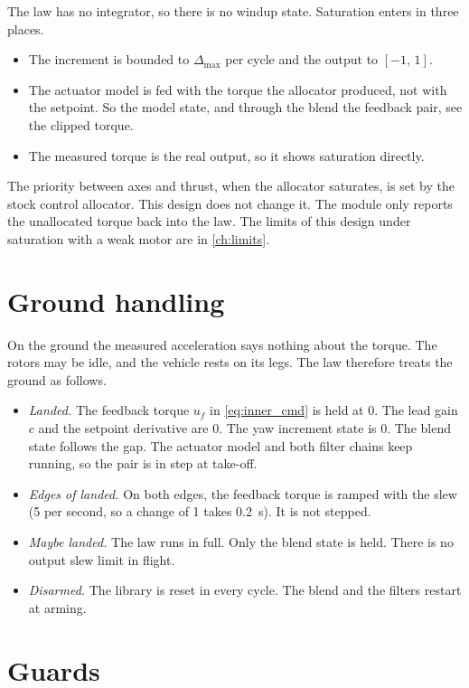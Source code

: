 The law has no integrator, so there is no windup state.
Saturation enters in three places.
\begin{itemize}
  \item The increment is bounded to $\Delta_{\max}$ per cycle and the output to $[-1,\,1]$.
  \item The actuator model is fed with the torque the allocator produced, not with the setpoint.
    So the model state, and through the blend the feedback pair, see the clipped torque.
  \item The measured torque is the real output, so it shows saturation directly.
\end{itemize}
The priority between axes and thrust, when the allocator saturates, is set by the stock control allocator.
This design does not change it.
The module only reports the unallocated torque back into the law.
The limits of this design under saturation with a weak motor are in \cref{ch:limits}.

\section{Ground handling}\label{sec:inner_ground}

On the ground the measured acceleration says nothing about the torque.
The rotors may be idle, and the vehicle rests on its legs.
The law therefore treats the ground as follows.
\begin{itemize}
  \item \emph{Landed.}
    The feedback torque $u_f$ in \cref{eq:inner_cmd} is held at 0.
    The lead gain $c$ and the setpoint derivative are 0.
    The yaw increment state is 0.
    The blend state follows the gap.
    The actuator model and both filter chains keep running, so the pair is in step at take-off.
  \item \emph{Edges of landed.}
    On both edges, the feedback torque is ramped with the slew  (5 per second, so a change of 1 takes 0.2~s).
    It is not stepped.
  \item \emph{Maybe landed.}
    The law runs in full.
    Only the blend state is held.
    There is no output slew limit in flight.
  \item \emph{Disarmed.}
    The library is reset in every cycle.
    The blend and the filters restart at arming.
\end{itemize}

\section{Guards}\label{sec:inner_guards}


